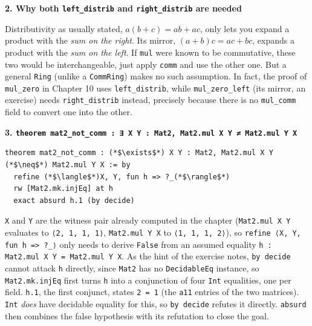 \textbf{2. Why both \texttt{left\_\allowbreak{}distrib} and \texttt{right\_\allowbreak{}distrib} are needed}

Distributivity as usually stated, \(a(b+c) = ab+ac\), only lets you expand a product with the \emph{sum on the right}. Its mirror, \((a+b)c = ac+bc\), expands a product with the \emph{sum on the left}. If \texttt{mul} were known to be commutative, these two would be interchangeable, just apply \texttt{comm} and use the other one. But a general \texttt{Ring} (unlike a \texttt{CommRing}) makes no such assumption. In fact, the proof of \texttt{mul\_\allowbreak{}zero} in Chapter 10 uses \texttt{left\_\allowbreak{}distrib}, while \texttt{mul\_\allowbreak{}zero\_\allowbreak{}left} (its mirror, an exercise) needs \texttt{right\_\allowbreak{}distrib} instead, precisely because there is no \texttt{mul\_\allowbreak{}comm} field to convert one into the other.

\textbf{3. \texttt{theorem mat2\_\allowbreak{}not\_\allowbreak{}comm : ∃ X Y : Mat2, Mat2.mul X Y ≠ Mat2.mul Y X}}

\begin{lstlisting}
theorem mat2_not_comm : (*$\exists$*) X Y : Mat2, Mat2.mul X Y (*$\neq$*) Mat2.mul Y X := by
  refine (*$\langle$*)X, Y, fun h => ?_(*$\rangle$*)
  rw [Mat2.mk.injEq] at h
  exact absurd h.1 (by decide)
\end{lstlisting}

\texttt{X} and \texttt{Y} are the witness pair already computed in the chapter (\texttt{Mat2.mul X Y} evaluates to \texttt{⟨2, 1, 1, 1⟩}, \texttt{Mat2.mul Y X} to \texttt{⟨1, 1, 1, 2⟩}), so \texttt{refine ⟨X, Y, fun h => ?\_\allowbreak{}⟩} only needs to derive \texttt{False} from an assumed equality \texttt{h : Mat2.mul X Y = Mat2.mul Y X}. As the hint of the exercise notes, \texttt{by decide} cannot attack \texttt{h} directly, since \texttt{Mat2} has no \texttt{DecidableEq} instance, so \texttt{Mat2.mk.injEq} first turns \texttt{h} into a conjunction of four \texttt{Int} equalities, one per field. \texttt{h.1}, the first conjunct, states \texttt{2 = 1} (the \texttt{a11} entries of the two matrices). \texttt{Int} \emph{does} have decidable equality for this, so \texttt{by decide} refutes it directly. \texttt{absurd} then combines the false hypothesis with its refutation to close the goal.
